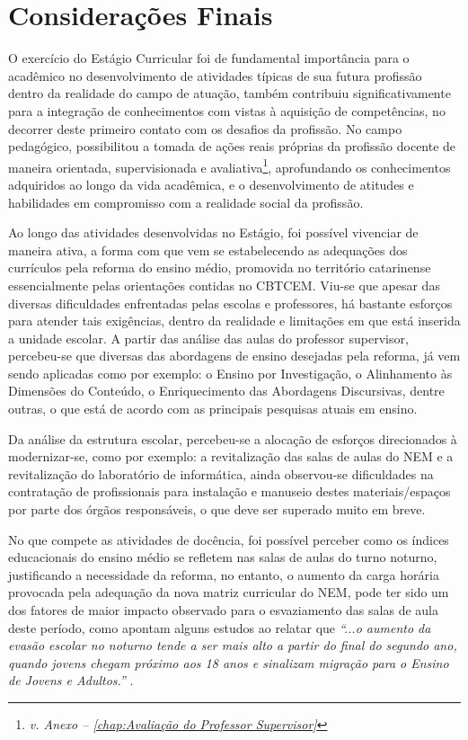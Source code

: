 \chapter{Considerações Finais} %
\label{chap:Considerações Finais}
O exercício do Estágio Curricular foi de fundamental importância para o acadêmico no desenvolvimento de atividades típicas de sua futura profissão dentro da realidade do campo de atuação, também contribuiu significativamente para a integração de conhecimentos com vistas à aquisição de competências, no decorrer deste primeiro contato com os desafios da profissão. No campo pedagógico, possibilitou a tomada de ações reais próprias da profissão docente de maneira orientada, supervisionada e avaliativa\footnote{\textit{v. Anexo -- \ref{chap:Avaliação do Professor Supervisor}}}, aprofundando os conhecimentos adquiridos ao longo da vida acadêmica, e o desenvolvimento de atitudes e habilidades em compromisso com a realidade social da profissão.

Ao longo das atividades desenvolvidas no Estágio, foi possível vivenciar de maneira ativa, a forma com que vem se estabelecendo as adequações dos currículos pela reforma do ensino médio, promovida no território catarinense  essencialmente pelas orientações contidas no \ac{CBTCEM}. Viu-se que apesar das diversas dificuldades enfrentadas pelas escolas e professores, há bastante esforços para atender tais exigências, dentro da realidade e limitações em que está inserida a unidade escolar. A partir das análise das aulas do professor supervisor, percebeu-se que diversas das abordagens de ensino desejadas pela reforma, já vem sendo aplicadas como por exemplo: o Ensino por Investigação, o Alinhamento às Dimensões do Conteúdo, o Enriquecimento das Abordagens Discursivas, dentre outras, o que está de acordo com as principais pesquisas atuais em ensino.

Da análise da estrutura escolar, percebeu-se a alocação de esforços direcionados à modernizar-se, como por exemplo: a revitalização das salas de aulas do \ac{NEM} e a revitalização do laboratório de informática, ainda observou-se dificuldades na contratação de profissionais para instalação e manuseio destes materiais/espaços por parte dos órgãos responsáveis, o que deve ser superado muito em breve.

No que compete as atividades de docência, foi possível perceber como os índices educacionais do ensino médio se refletem nas salas de aulas do turno noturno, justificando a necessidade da reforma, no entanto, o aumento da carga horária provocada pela adequação da nova matriz curricular do \ac{NEM}, pode ter sido um dos fatores de maior impacto observado para o esvaziamento das salas de aula deste período, como apontam alguns estudos ao relatar que \textit{``...o aumento da evasão escolar no noturno tende a ser mais alto a partir do final do segundo ano, quando jovens chegam próximo aos 18 anos e sinalizam migração para o Ensino de Jovens e Adultos.''} \cite{SINTE:2023}.

